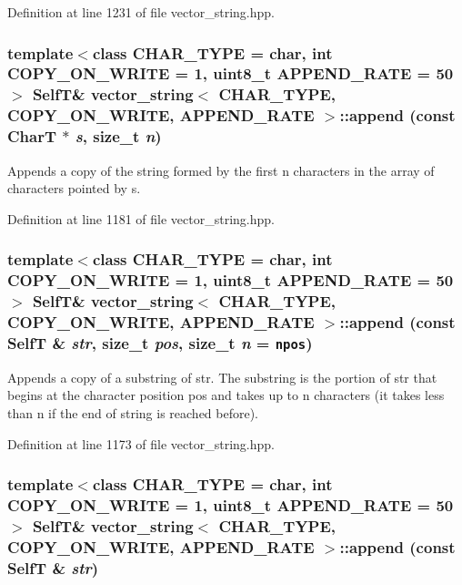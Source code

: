 Definition at line 1231 of file vector\_\-string.hpp.\hypertarget{classvector__string_680eb4134425df7845f49bcdc852bee7}{
\subsubsection[{append}]{\setlength{\rightskip}{0pt plus 5cm}template$<$class CHAR\_\-TYPE  = char, int COPY\_\-ON\_\-WRITE = 1, uint8\_\-t APPEND\_\-RATE = 50$>$ {\bf SelfT}\& {\bf vector\_\-string}$<$ CHAR\_\-TYPE, COPY\_\-ON\_\-WRITE, APPEND\_\-RATE $>$::append (const CharT $\ast$ {\em s}, \/  size\_\-t {\em n})}}
\label{classvector__string_680eb4134425df7845f49bcdc852bee7}


Appends a copy of the string formed by the first n characters in the array of characters pointed by s. 

Definition at line 1181 of file vector\_\-string.hpp.\hypertarget{classvector__string_e6255b18101142fcc319bff78d143e55}{
\subsubsection[{append}]{\setlength{\rightskip}{0pt plus 5cm}template$<$class CHAR\_\-TYPE  = char, int COPY\_\-ON\_\-WRITE = 1, uint8\_\-t APPEND\_\-RATE = 50$>$ {\bf SelfT}\& {\bf vector\_\-string}$<$ CHAR\_\-TYPE, COPY\_\-ON\_\-WRITE, APPEND\_\-RATE $>$::append (const {\bf SelfT} \& {\em str}, \/  size\_\-t {\em pos}, \/  size\_\-t {\em n} = {\tt {\bf npos}})}}
\label{classvector__string_e6255b18101142fcc319bff78d143e55}


Appends a copy of a substring of str. The substring is the portion of str that begins at the character position pos and takes up to n characters (it takes less than n if the end of string is reached before). 

Definition at line 1173 of file vector\_\-string.hpp.\hypertarget{classvector__string_8117d617b230c2dc55045b58a026a70c}{
\subsubsection[{append}]{\setlength{\rightskip}{0pt plus 5cm}template$<$class CHAR\_\-TYPE  = char, int COPY\_\-ON\_\-WRITE = 1, uint8\_\-t APPEND\_\-RATE = 50$>$ {\bf SelfT}\& {\bf vector\_\-string}$<$ CHAR\_\-TYPE, COPY\_\-ON\_\-WRITE, APPEND\_\-RATE $>$::append (const {\bf SelfT} \& {\em str})}}
\label{classvector__string_8117d617b230c2dc55045b58a026a70c}


